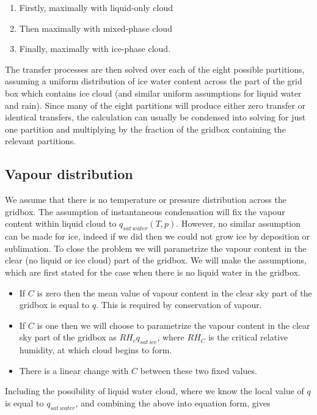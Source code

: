 \documentclass{UMDP_article}
\begin{document}
\begin{enumerate}
\item Firstly, maximally with liquid-only cloud
\item Then maximally with mixed-phase cloud
\item Finally, maximally with ice-phase cloud.
\end{enumerate}

The transfer processes are then solved over each of the eight possible partitions,
assuming a uniform distribution of ice water content across the part of the grid
box which contains ice cloud (and similar uniform assumptions for liquid water
and rain). Since many of the eight partitions will produce either zero transfer
or identical transfers, the calculation can usually be condensed into solving for
just one partition and multiplying by the fraction of the gridbox containing the
relevant partitions.

\subsection{Vapour distribution}

We assume that there is
no temperature or pressure distribution across the gridbox.
The assumption of instantaneous condensation will fix the vapour content within
liquid cloud to $q_{sat~water} ({T}, {p})$. However, no similar
assumption can be made for ice, indeed if we did then we could not grow ice by
deposition or sublimation. To close the problem we will parametrize the vapour
content in the clear (no liquid or ice cloud) part of the gridbox. We will make
the assumptions, which are first stated for the case when there is no liquid
water in the gridbox.

\begin{itemize}
\item{If $C$ is zero then the mean value of vapour content in the clear sky part of
the gridbox is equal to $q$. This is required by conservation of vapour.}
\item{If $C$ is one then we will choose to parametrize 
the vapour content in the clear sky part of the gridbox as $RH_c q_{sat~ice}$, where
$RH_C$ is the critical relative humidity, at which cloud begins to form.}
\item{There is a linear change with $C$ between these two fixed values.}
\end{itemize} 

Including the possibility of liquid water cloud, where we know the local 
value of $q$ is equal to $q_{sat~water}$, and combining the above into equation 
form, gives 
\end{document}
